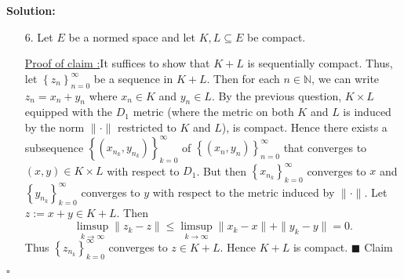 \documentclass[12pt]{article}
\newcounter{ProofCounter}
\newcounter{ClaimCounter}[ProofCounter]
\newenvironment{Solution}{\stepcounter{ProofCounter}\textbf{Solution:}}{\hfill$\square$}
\newenvironment{claim}[1]{\vspace{1mm}\stepcounter{ClaimCounter}\par\noindent\underline{\bf Claim \theClaimCounter:}\space#1}{}
\newenvironment{claimproof}[1]{\par\noindent\underline{Proof of claim \theClaimCounter:}\space#1}{\hfill $\blacksquare$ Claim \theClaimCounter}
\begin{document}
\begin{Solution}
\begin{enumerate}
      \begin{claimproof}
        Since $K$ is a metric space, it suffices to show that $K$ is sequentially compact.
        Let $\left\{ x_k \right\}_{k=0}^{\infty}$ be a sequence in $K$, where $x_k := (x_{k,1}, \dots, x_{k,n})$ for each $k \in \mathbb{N}$.
        Since $K_1$ is compact, there exists a subsequence $\{x_{k_j, 1}\}_{j=0}^{\infty}$ of $\{x_{k,1}\}_{k=0}^{\infty}$ that
        converges in $K_1$. But since $K_2$ is compact, there exists a convergent subsequence
        $\{x_{k_{j_i},2}\}_{i=0}^{\infty}$ of $\{x_{k_j,2}\}_{j=0}^{\infty}$ that converges in $K_2$. Continuing in this manner, we can construct a
        subsequence $\{x_{k_l}\}_{l=0}^{\infty}$ of $\{x_{k}\}_{k=0}^{\infty}$, where $x_{k_l} = (x_{k_l,1}, \dots, x_{k_l,n})$, 
        such that $\{x_{k_l,m}\}_{l=0}^{\infty}$ converges in $K_m$ for each $m = 1, \dots, n$. Let $y_{m}$ be the limit of
        $\{x_{k_l,m}\}_{l=0}^{\infty}$ be each $m = 1, \dots, n$. Let $y := (y_1, \dots, y_n) \in K$. Then 
        \[
          \lim_{l\rightarrow\infty} d(x_{k_l}, y) = \lim_{l\rightarrow\infty} \sum_{m=1}^{n}d_{m}(x_{k_l,m}, y_{m}) =
          \sum_{m=1}^{n}\lim_{l\rightarrow\infty} d_{m}(x_{k_l,m}, y_{m}) = 0.
        \]
        Hence $\left\{ x_{k_l} \right\}_{l=0}^{\infty}$ converges in $K$.
      \end{claimproof}


    \item[6.] Let $E$ be a normed space and let $K, L \subseteq E$ be compact.

      \begin{claimproof}
        It suffices to show that $K + L$ is sequentially compact. Thus, let $\left\{ z_n \right\}_{n=0}^{\infty}$ be a sequence in $K + L$.  
        Then for each $n \in \mathbb{N}$, we can write $z_n = x_n + y_n$ where $x_n \in K$ and $y_n \in L$.
        By the previous question, $K\times L$ equipped with the $D_1$ metric (where the metric on both $K$ and $L$ is induced by the norm $\|\cdot \|$
        restricted to $K$ and $L$), is
        compact. Hence there exists a subsequence $\left\{ (x_{n_k}, y_{n_k}) \right\}_{k=0}^{\infty}$ of $\left\{ (x_n, y_n) \right\}_{n=0}^{\infty}$
        that converges to $(x, y) \in K\times L$ with respect to $D_1$. But then $\left\{ x_{n_k} \right\}_{k=0}^{\infty}$ converges to $x$ and 
        $\left\{ y_{n_k} \right\}_{k=0}^{\infty}$ converges to $y$ with respect to the metric induced by $\|\cdot \|$. Let $z := x + y \in K + L$.  
        Then
        \[
          \limsup_{k\rightarrow\infty}\|z_k - z\| \leq \limsup_{k\rightarrow\infty}\|x_k - x\| + \|y_k - y\| = 0.
        \]
        Thus $\left\{ z_{n_k} \right\}_{k=0}^{\infty}$ converges to $z \in K + L$. Hence $K + L$ is compact.
      \end{claimproof}


\end{enumerate}
\end{Solution}
\end{document}
